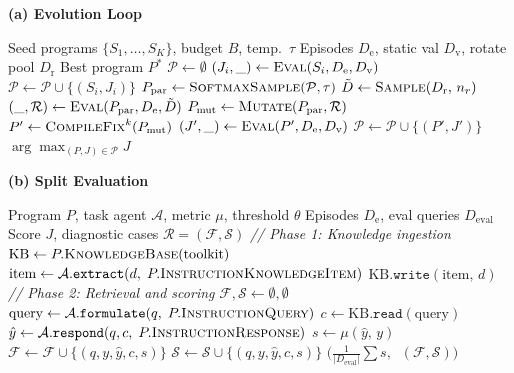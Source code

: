 \begin{algorithm}[!htbp]
\caption{\textbf{Reflective code evolution for memory-program search.}
The left panel gives the population-based evolution loop, and the right panel gives split evaluation for a candidate program.}
\label{alg:evolution}
\begin{minipage}[t]{0.47\linewidth}
\textbf{(a) Evolution Loop} \label{alg:evolution-loop}
\begin{algorithmic}[1]
\REQUIRE Seed programs $\{S_1,\ldots,S_K\}$, budget $B$, temp.\ $\tau$
\REQUIRE Episodes $D_\text{e}$, static val $D_\text{v}$, rotate pool $D_\text{r}$
\ENSURE Best program $P^*$
\STATE $\mathcal{P} \gets \emptyset$
    \STATE $(J_i, \_) \gets \textsc{Eval}(S_i, D_\text{e}, D_\text{v})$
    \STATE $\mathcal{P} \gets \mathcal{P} \cup \{(S_i, J_i)\}$
\ENDFOR
{}
    \STATE $P_\text{par} \gets \textsc{SoftmaxSample}(\mathcal{P}, \tau)$
    \STATE $\tilde{D} \gets \textsc{Sample}(D_\text{r},\, n_r)$
    \STATE $(\_, \mathcal{R}) \gets \textsc{Eval}(P_\text{par}, D_\text{e}, \tilde{D})$
    \STATE $P_\text{mut} \gets \textsc{Mutate}(P_\text{par}, \mathcal{R})$
    \STATE $P' \gets \textsc{CompileFix}^{k}(P_\text{mut})$ 
        \STATE $(J', \_) \gets \textsc{Eval}(P', D_\text{e}, D_\text{v})$
        \STATE $\mathcal{P} \gets \mathcal{P} \cup \{(P', J')\}$
    \ENDIF
\ENDFOR
\RETURN $\arg\max_{(P,J) \in \mathcal{P}} J$
\end{algorithmic}
\end{minipage}%
\hfill
\begin{minipage}[t]{0.50\linewidth}
\textbf{(b) Split Evaluation} \label{alg:split-eval}
\begin{algorithmic}[1]
\REQUIRE Program $P$, task agent $\mathcal{A}$, metric $\mu$, threshold $\theta$
\REQUIRE Episodes $D_\text{e}$, eval queries $D_\text{eval}$
\ENSURE Score $J$, diagnostic cases $\mathcal{R}=(\mathcal{F},\mathcal{S})$
\STATE \textit{// Phase 1: Knowledge ingestion}
\STATE $\text{KB} \gets P.\textsc{KnowledgeBase}(\text{toolkit})$
    \STATE $\text{item} \gets \mathcal{A}.\texttt{extract}(d,\; P.\textsc{InstructionKnowledgeItem})$
    \STATE $\text{KB}.\texttt{write}(\text{item},\, d)$
\ENDFOR
\STATE \textit{// Phase 2: Retrieval and scoring}
\STATE $\mathcal{F}, \mathcal{S} \gets \emptyset, \emptyset$
    \STATE $\text{query} \gets \mathcal{A}.\texttt{formulate}(q,\; P.\textsc{InstructionQuery})$
    \STATE $c \gets \text{KB}.\texttt{read}(\text{query})$
    \STATE $\hat{y} \gets \mathcal{A}.\texttt{respond}(q, c,\; P.\textsc{InstructionResponse})$
    \STATE $s \gets \mu(\hat{y},\, y)$
        \STATE $\mathcal{F} \gets \mathcal{F} \cup \{(q, y, \hat{y}, c, s)\}$
    \ELSE
        \STATE $\mathcal{S} \gets \mathcal{S} \cup \{(q, y, \hat{y}, c, s)\}$
    \ENDIF
\ENDFOR
\RETURN $\bigl(\tfrac{1}{|D_\text{eval}|}\sum s,\;\; (\mathcal{F}, \mathcal{S})\bigr)$
\end{algorithmic}
\end{minipage}
\end{algorithm}

